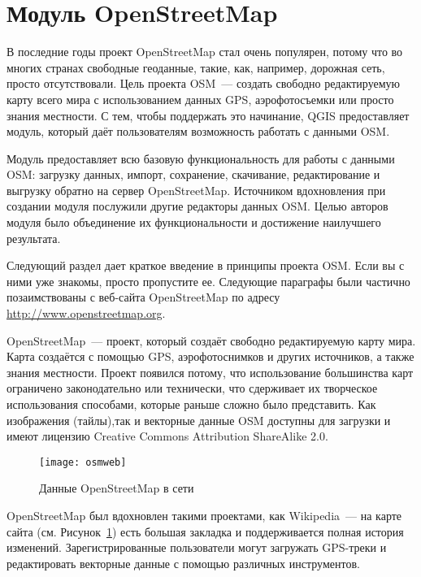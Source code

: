 
\section{Модуль OpenStreetMap}\label{plugins_osm}


В последние годы проект OpenStreetMap стал очень популярен, потому что
во многих странах свободные геоданные, такие, как, например, дорожная сеть,
просто отсутствовали. Цель проекта OSM~--- создать свободно редактируемую
карту всего мира с использованием данных GPS, аэрофотосъемки или просто знания
местности. С тем, чтобы поддержать это начинание, QGIS предоставляет
модуль, который даёт пользователям возможность работать с данными OSM.

Модуль предоставляет всю базовую функциональность для работы с данными
OSM: загрузку данных, импорт, сохранение, скачивание, редактирование и
выгрузку обратно на сервер OpenStreetMap. Источником вдохновления при
создании модуля послужили другие редакторы данных OSM. Целью авторов
модуля было объединение их функциональности и достижение наилучшего
результата.

Следующий раздел дает краткое введение в принципы проекта OSM. Если вы
с ними уже знакомы, просто пропустите ее. Следующие параграфы были
частично позаимствованы с веб-сайта OpenStreetMap по адресу
\url{http://www.openstreetmap.org}.


OpenStreetMap~--- проект, который создаёт свободно редактируемую карту
мира. Карта создаётся с помощью GPS, аэрофотоснимков и других источников, а
также знания местности. Проект появился потому, что использование
большинства карт ограничено законодательно или технически, что
сдерживает их творческое использования способами, которые раньше сложно
было представить. Как изображения (тайлы),так и  векторные данные OSM доступны
для загрузки и имеют лицензию Creative Commons Attribution ShareAlike 2.0.

\begin{figure}[ht]
   \centering
   \texttt{[image: osmweb]}
   \caption{Данные OpenStreetMap в сети \wincaption}\label{fig:osmweb}
\end{figure}

OpenStreetMap был вдохновлен такими проектами, как Wikipedia~--- на карте
сайта (см. Рисунок~\ref{fig:osmweb}) есть большая закладка
 и поддерживается полная история изменений.
Зарегистрированные пользователи могут загружать GPS-треки и редактировать
векторные данные с помощью различных инструментов.


